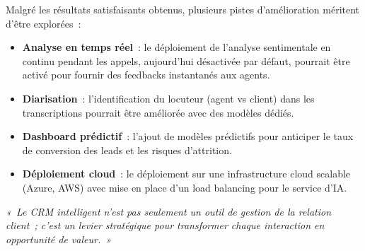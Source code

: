 Malgré les résultats satisfaisants obtenus, plusieurs pistes d'amélioration
méritent d'être explorées~:
\begin{itemize}
    \item \textbf{Analyse en temps réel}~: le déploiement de l'analyse
    sentimentale en continu pendant les appels, aujourd'hui désactivée par
    défaut, pourrait être activé pour fournir des feedbacks instantanés aux
    agents.
    \item \textbf{Diarisation}~: l'identification du locuteur (agent vs client)
    dans les transcriptions pourrait être améliorée avec des modèles dédiés.
    \item \textbf{Dashboard prédictif}~: l'ajout de modèles prédictifs pour
    anticiper le taux de conversion des leads et les risques d'attrition.
    \item \textbf{Déploiement cloud}~: le déploiement sur une infrastructure
    cloud scalable (Azure, AWS) avec mise en place d'un load balancing pour
    le service d'IA.
\end{itemize}

\vspace{0.5cm}

\begin{center}
    \begin{tcolorbox}[
        colback=lightBlue,
        colframe=tekupBlue,
        boxrule=0.8pt,
        arc=6pt,
        width=0.85\linewidth,
        halign=center
    ]
        \itshape
        «~Le CRM intelligent n'est pas seulement un outil de gestion de la relation
        client~; c'est un levier stratégique pour transformer chaque interaction
        en opportunité de valeur.~»
    \end{tcolorbox}
\end{center}
